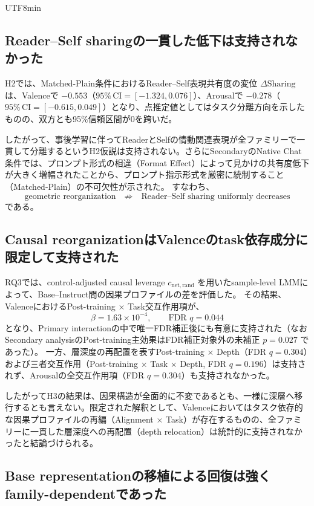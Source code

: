 \documentclass{article} %
\begin{document}
\begin{CJK*}{UTF8}{min}
\subsection{Reader--Self sharingの一貫した低下は支持されなかった}

H2では、Matched-Plain条件におけるReader--Self表現共有度の変位 $\Delta\text{Sharing}$ は、Valenceで $-0.553$（$95\%\,\text{CI} = [-1.324, 0.076]$）、Arousalで $-0.278$（$95\%\,\text{CI} = [-0.615, 0.049]$）となり、点推定値としてはタスク分離方向を示したものの、双方とも95\%信頼区間が0を跨いだ。

したがって、事後学習に伴ってReaderとSelfの情動関連表現が全ファミリーで一貫して分離するというH2仮説は支持されない。さらにSecondaryのNative Chat条件では、プロンプト形式の相違（Format Effect）によって見かけの共有度低下が大きく増幅されたことから、プロンプト指示形式を厳密に統制すること（Matched-Plain）の不可欠性が示された。
すなわち、
\[
\text{geometric reorganization}
\quad\not\Rightarrow\quad
\text{Reader--Self sharing uniformly decreases}
\]
である。


\subsection{Causal reorganizationはValenceのtask依存成分に限定して支持された}

RQ3では、control-adjusted causal leverage \(c_{\mathrm{net,rand}}\) を用いたsample-level LMMによって、Base--Instruct間の因果プロファイルの差を評価した。
その結果、ValenceにおけるPost-training $\times$ Task交互作用項が、
\[
\beta = 1.63\times10^{-4}, \qquad \text{FDR } q = 0.044
\]
となり、Primary interactionの中で唯一FDR補正後にも有意に支持された（なおSecondary analysisのPost-training主効果はFDR補正対象外の未補正 $p = 0.027$ であった）。
一方、層深度の再配置を表すPost-training $\times$ Depth（FDR $q = 0.304$）および三者交互作用（Post-training $\times$ Task $\times$ Depth, FDR $q = 0.196$）は支持されず、Arousalの全交互作用項（FDR $q = 0.304$）も支持されなかった。

したがってH3の結果は、因果構造が全面的に不変であるとも、一様に深層へ移行するとも言えない。限定された解釈として、Valenceにおいてはタスク依存的な因果プロファイルの再編（Alignment $\times$ Task）が存在するものの、全ファミリーに一貫した層深度への再配置（depth relocation）は統計的に支持されなかったと結論づけられる。


\subsection{Base representationの移植による回復は強くfamily-dependentであった}


\end{CJK*}
\end{document}
